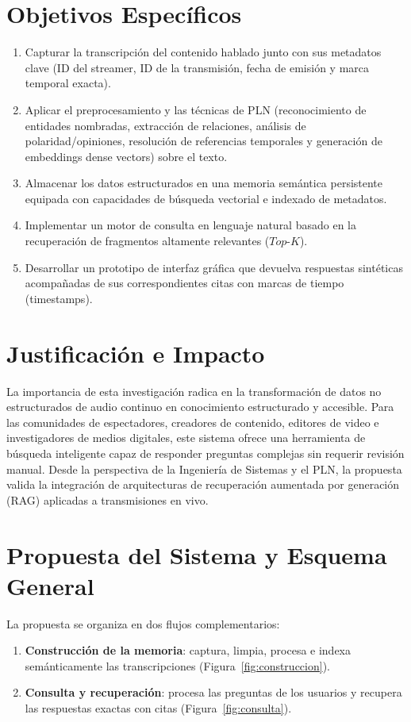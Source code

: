 \documentclass[12pt,a4paper]{article}
\begin{document}
\section{Objetivos Específicos}
\begin{enumerate}
  \item Capturar la transcripción del contenido hablado junto con sus metadatos clave (ID del streamer, ID de la transmisión, fecha de emisión y marca temporal exacta).
  \item Aplicar el preprocesamiento y las técnicas de PLN (reconocimiento de entidades nombradas, extracción de relaciones, análisis de polaridad/opiniones, resolución de referencias temporales y generación de embeddings dense vectors) sobre el texto.
  \item Almacenar los datos estructurados en una memoria semántica persistente equipada con capacidades de búsqueda vectorial e indexado de metadatos.
  \item Implementar un motor de consulta en lenguaje natural basado en la recuperación de fragmentos altamente relevantes ($Top\text{-}K$).
  \item Desarrollar un prototipo de interfaz gráfica que devuelva respuestas sintéticas acompañadas de sus correspondientes citas con marcas de tiempo (timestamps).
\end{enumerate}

\section{Justificación e Impacto}
La importancia de esta investigación radica en la transformación de datos no estructurados de audio continuo en conocimiento estructurado y accesible. Para las comunidades de espectadores, creadores de contenido, editores de video e investigadores de medios digitales, este sistema ofrece una herramienta de búsqueda inteligente capaz de responder preguntas complejas sin requerir revisión manual. Desde la perspectiva de la Ingeniería de Sistemas y el PLN, la propuesta valida la integración de arquitecturas de recuperación aumentada por generación (RAG) aplicadas a transmisiones en vivo.

\section{Propuesta del Sistema y Esquema General}
La propuesta se organiza en dos flujos complementarios:
\begin{enumerate}
  \item \textbf{Construcción de la memoria}: captura, limpia, procesa e indexa semánticamente las transcripciones (Figura~\ref{fig:construccion}).
  \item \textbf{Consulta y recuperación}: procesa las preguntas de los usuarios y recupera las respuestas exactas con citas (Figura~\ref{fig:consulta}).
\end{enumerate}
\end{document}
